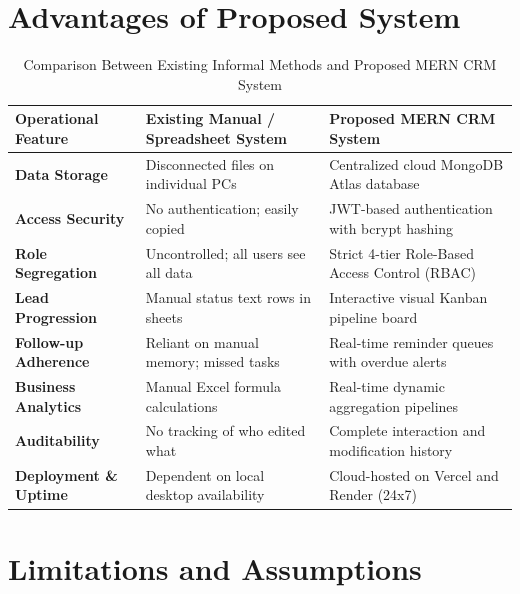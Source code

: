 \section{Advantages of Proposed System}
\begin{table}[h!]
\centering
\caption{Comparison Between Existing Informal Methods and Proposed MERN CRM System}
\label{tab:system_comparison}
\renewcommand{\arraystretch}{1.3}
\begin{tabular}{|p{3.5cm}|p{5.5cm}|p{5.5cm}|}
\hline
\textbf{Operational Feature} & \textbf{Existing Manual / Spreadsheet System} & \textbf{Proposed MERN CRM System} \\ \hline
\textbf{Data Storage} & Disconnected files on individual PCs & Centralized cloud MongoDB Atlas database \\ \hline
\textbf{Access Security} & No authentication; easily copied & JWT-based authentication with bcrypt hashing \\ \hline
\textbf{Role Segregation} & Uncontrolled; all users see all data & Strict 4-tier Role-Based Access Control (RBAC) \\ \hline
\textbf{Lead Progression} & Manual status text rows in sheets & Interactive visual Kanban pipeline board \\ \hline
\textbf{Follow-up Adherence} & Reliant on manual memory; missed tasks & Real-time reminder queues with overdue alerts \\ \hline
\textbf{Business Analytics} & Manual Excel formula calculations & Real-time dynamic aggregation pipelines \\ \hline
\textbf{Auditability} & No tracking of who edited what & Complete interaction and modification history \\ \hline
\textbf{Deployment \& Uptime} & Dependent on local desktop availability & Cloud-hosted on Vercel and Render (24x7) \\ \hline
\end{tabular}
\end{table}

\section{Limitations and Assumptions}
